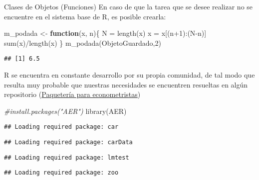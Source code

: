 \documentclass[
  10,
  ignorenonframetext,
]{beamer}
\newenvironment{Shaded}{\begin{snugshade}}{\end{snugshade}}
\newcommand{\CommentTok}[1]{\textcolor[rgb]{0.56,0.35,0.01}{\textit{#1}}}
\newcommand{\ControlFlowTok}[1]{\textcolor[rgb]{0.13,0.29,0.53}{\textbf{#1}}}
\newcommand{\DecValTok}[1]{\textcolor[rgb]{0.00,0.00,0.81}{#1}}
\newcommand{\FunctionTok}[1]{\textcolor[rgb]{0.00,0.00,0.00}{#1}}
\newcommand{\NormalTok}[1]{#1}
\newcommand{\OtherTok}[1]{\textcolor[rgb]{0.56,0.35,0.01}{#1}}
\newcommand{\SpecialCharTok}[1]{\textcolor[rgb]{0.00,0.00,0.00}{#1}}
\begin{document}
\begin{frame}[fragile]{Clases de Objetos (Funciones)}
\protect\hypertarget{clases-de-objetos-funciones-1}{}
En caso de que la tarea que se desee realizar no se encuentre en el
sistema base de R, es posible crearla:

\begin{Shaded}
\begin{Highlighting}[]
\NormalTok{m\_podada }\OtherTok{\textless{}{-}} \ControlFlowTok{function}\NormalTok{(x, n)\{}
\NormalTok{  N }\OtherTok{=} \FunctionTok{length}\NormalTok{(x)}
\NormalTok{  x }\OtherTok{=}\NormalTok{ x[(n}\SpecialCharTok{+}\DecValTok{1}\NormalTok{)}\SpecialCharTok{:}\NormalTok{(N}\SpecialCharTok{{-}}\NormalTok{n)]}
  \FunctionTok{sum}\NormalTok{(x)}\SpecialCharTok{/}\FunctionTok{length}\NormalTok{(x)}
\NormalTok{\}}
\FunctionTok{m\_podada}\NormalTok{(ObjetoGuardado,}\DecValTok{2}\NormalTok{)}
\end{Highlighting}
\end{Shaded}

\begin{verbatim}
## [1] 6.5
\end{verbatim}

R se encuentra en constante desarrollo por su propia comunidad, de tal
modo que resulta muy probable que nuestras necesidades se encuentren
resueltas en algún repositorio
(\href{https://cran.r-project.org/web/views/Econometrics.html}{Paquetería
para econometristas})

\begin{Shaded}
\begin{Highlighting}[]
\CommentTok{\#install.packages("AER")}
\FunctionTok{library}\NormalTok{(AER)}
\end{Highlighting}
\end{Shaded}

\begin{verbatim}
## Loading required package: car
\end{verbatim}

\begin{verbatim}
## Loading required package: carData
\end{verbatim}

\begin{verbatim}
## Loading required package: lmtest
\end{verbatim}

\begin{verbatim}
## Loading required package: zoo
\end{verbatim}


\end{frame}
\end{document}
